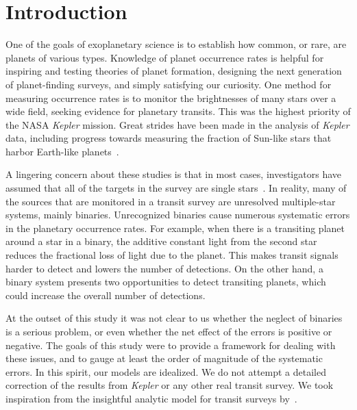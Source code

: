 \documentclass[12pt,modern]{aastex61}
\begin{document}
\section{Introduction}

One of the goals of exoplanetary science is to establish how common,
or rare, are planets of various types.  Knowledge of planet occurrence
rates is helpful for inspiring and testing theories of planet
formation, designing the next generation of planet-finding surveys,
and simply satisfying our curiosity.  One method for measuring
occurrence rates is to monitor the brightnesses of many stars over a
wide field, seeking evidence for planetary transits.  This was the
highest priority of the NASA {\it Kepler} mission.  Great strides have
been made in the analysis of {\it Kepler} data, including progress
towards measuring the fraction of Sun-like stars that harbor
Earth-like planets~\citep{
  youdin_exoplanet_2011,petigura_prevalence_2013,dong_fast_2013,
  foreman-mackey_exoplanet_2014,burke_terrestrial_2015}.

A lingering concern about these studies is that in most cases,
investigators have assumed that all of the targets in the survey
are single stars~\citep[\textit{e.g.},][]{
  howard_planet_2012,fressin_false_2013,
  dressing_occurrence_2015,burke_terrestrial_2015}. 
In reality, many of the sources that are monitored in a transit survey are
unresolved multiple-star systems, mainly binaries.  Unrecognized
binaries cause numerous systematic errors in the planetary occurrence
rates.  For example, when there is a transiting planet around a star
in a binary, the additive constant light from the second star reduces
the fractional loss of light due to the planet.  This makes transit
signals harder to detect and lowers the number of detections.  On the
other hand, a binary system presents two opportunities to detect
transiting planets, which could increase the overall number of
detections.

At the outset of this study it was not clear to us whether the neglect
of binaries is a serious problem, or even whether the net effect of
the errors is positive or negative.  The goals of this study were to
provide a framework for dealing with these issues, and to gauge at
least the order of magnitude of the systematic errors.  In this
spirit, our models are idealized.  We do not attempt a detailed
correction of the results from {\it Kepler} or any other real transit
survey.  We took inspiration from the insightful analytic model for
transit surveys by~\citet{pepper_using_2003}.
\end{document}
